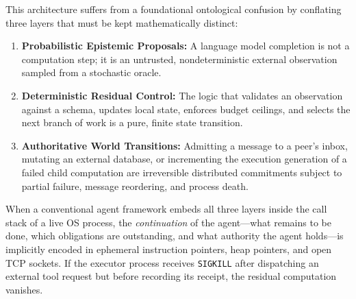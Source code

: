 \documentclass[11pt,a4paper]{article}
\theoremstyle{definition}
\theoremstyle{remark}
\begin{document}
This architecture suffers from a foundational ontological confusion by conflating three layers that must be kept mathematically distinct:
\begin{enumerate}
  \item \textbf{Probabilistic Epistemic Proposals:} A language model completion is not a computation step; it is an untrusted, nondeterministic external observation sampled from a stochastic oracle.
  \item \textbf{Deterministic Residual Control:} The logic that validates an observation against a schema, updates local state, enforces budget ceilings, and selects the next branch of work is a pure, finite state transition.
  \item \textbf{Authoritative World Transitions:} Admitting a message to a peer's inbox, mutating an external database, or incrementing the execution generation of a failed child computation are irreversible distributed commitments subject to partial failure, message reordering, and process death.
\end{enumerate}

When a conventional agent framework embeds all three layers inside the call stack of a live OS process, the \emph{continuation} of the agent---what remains to be done, which obligations are outstanding, and what authority the agent holds---is implicitly encoded in ephemeral instruction pointers, heap pointers, and open TCP sockets. If the executor process receives \texttt{SIGKILL} after dispatching an external tool request but before recording its receipt, the residual computation vanishes.
\end{document}
